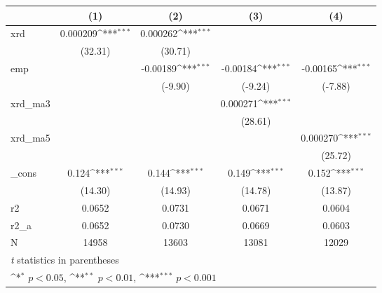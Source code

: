 {
\def\sym#1{\ifmmode^{#1}\else\(^{#1}\)\fi}
\begin{tabular}{l*{4}{c}}
\hline\hline
            &\multicolumn{1}{c}{(1)}         &\multicolumn{1}{c}{(2)}         &\multicolumn{1}{c}{(3)}         &\multicolumn{1}{c}{(4)}         \\
\hline
xrd         &    0.000209\sym{***}&    0.000262\sym{***}&                     &                     \\
            &     (32.31)         &     (30.71)         &                     &                     \\
[1em]
emp         &                     &    -0.00189\sym{***}&    -0.00184\sym{***}&    -0.00165\sym{***}\\
            &                     &     (-9.90)         &     (-9.24)         &     (-7.88)         \\
[1em]
xrd\_ma3     &                     &                     &    0.000271\sym{***}&                     \\
            &                     &                     &     (28.61)         &                     \\
[1em]
xrd\_ma5     &                     &                     &                     &    0.000270\sym{***}\\
            &                     &                     &                     &     (25.72)         \\
[1em]
\_cons      &       0.124\sym{***}&       0.144\sym{***}&       0.149\sym{***}&       0.152\sym{***}\\
            &     (14.30)         &     (14.93)         &     (14.78)         &     (13.87)         \\
\hline
r2          &      0.0652         &      0.0731         &      0.0671         &      0.0604         \\
r2\_a        &      0.0652         &      0.0730         &      0.0669         &      0.0603         \\
N           &       14958         &       13603         &       13081         &       12029         \\
\hline\hline
\multicolumn{5}{l}{\footnotesize \textit{t} statistics in parentheses}\\
\multicolumn{5}{l}{\footnotesize \sym{*} \(p<0.05\), \sym{**} \(p<0.01\), \sym{***} \(p<0.001\)}\\
\end{tabular}
}
